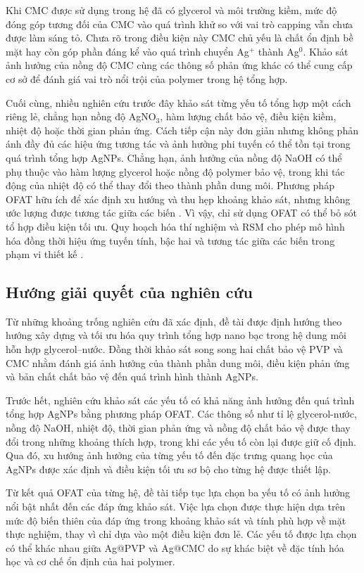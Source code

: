 Khi CMC được sử dụng trong hệ đã có glycerol và môi trường kiềm, mức độ đóng góp tương đối của CMC vào quá trình khử so với vai trò capping vẫn chưa được làm sáng tỏ.
Chưa rõ trong điều kiện này CMC chủ yếu là chất ổn định bề mặt hay còn góp phần đáng kể vào quá trình chuyển Ag$^+$ thành Ag$^0$.
Khảo sát ảnh hưởng của nồng độ CMC cùng các thông số phản ứng khác có thể cung cấp cơ sở để đánh giá vai trò nổi trội của polymer trong hệ tổng hợp.
\par
Cuối cùng, nhiều nghiên cứu trước đây khảo sát từng yếu tố tổng hợp một cách riêng lẻ, chẳng hạn nồng độ AgNO$_3$, hàm lượng chất bảo vệ, điều kiện kiềm, nhiệt độ hoặc thời gian phản ứng.
Cách tiếp cận này đơn giản nhưng không phản ánh đầy đủ các hiệu ứng tương tác và ảnh hưởng phi tuyến có thể tồn tại trong quá trình tổng hợp AgNPs.
Chẳng hạn, ảnh hưởng của nồng độ NaOH có thể phụ thuộc vào hàm lượng glycerol hoặc nồng độ polymer bảo vệ, trong khi tác động của nhiệt độ có thể thay đổi theo thành phần dung môi.
Phương pháp OFAT hữu ích để xác định xu hướng và thu hẹp khoảng khảo sát, nhưng không ước lượng được tương tác giữa các biến \parencite{bezerra2008,montgomery2017}.
Vì vậy, chỉ sử dụng OFAT có thể bỏ sót tổ hợp điều kiện tối ưu.
Quy hoạch hóa thí nghiệm và RSM cho phép mô hình hóa đồng thời hiệu ứng tuyến tính, bậc hai và tương tác giữa các biến trong phạm vi thiết kế \parencite{bezerra2008,khuri2010}.

\subsection{Hướng giải quyết của nghiên cứu}
Từ những khoảng trống nghiên cứu đã xác định, đề tài được định hướng theo hướng xây dựng và tối ưu hóa quy trình tổng hợp nano bạc trong hệ dung môi hỗn hợp glycerol–nước. 
Đồng thời khảo sát song song hai chất bảo vệ PVP và CMC nhằm đánh giá ảnh hưởng của thành phần dung môi, điều kiện phản ứng và bản chất chất bảo vệ đến quá trình hình thành AgNPs.
\par
Trước hết, nghiên cứu khảo sát các yếu tố có khả năng ảnh hưởng đến quá trình tổng hợp AgNPs bằng phương pháp OFAT.
Các thông số như tỉ lệ glycerol-nước, nồng độ NaOH, nhiệt độ, thời gian phản ứng và nồng độ chất bảo vệ được thay đổi trong những khoảng thích hợp, trong khi các yếu tố còn lại được giữ cố định.
Qua đó, xu hướng ảnh hưởng của từng yếu tố đến đặc trưng quang học của AgNPs được xác định và điều kiện tối ưu sơ bộ cho từng hệ được thiết lập.

Từ kết quả OFAT của từng hệ, đề tài tiếp tục lựa chọn ba yếu tố có ảnh hưởng nổi bật nhất đến các đáp ứng khảo sát. 
Việc lựa chọn được thực hiện dựa trên mức độ biến thiên của đáp ứng trong khoảng khảo sát và tính phù hợp về mặt thực nghiệm, thay vì chỉ dựa vào một điều kiện đơn lẻ. 
Các yếu tố được lựa chọn có thể khác nhau giữa Ag@PVP và Ag@CMC do sự khác biệt về đặc tính hóa học và cơ chế ổn định của hai polymer.

